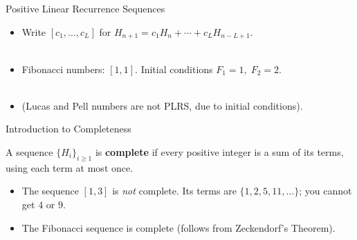 \documentclass[handout]{beamer}
\begin{document}
\begin{frame}{ 
    Positive Linear Recurrence Sequences}
    \begin{itemize}
        \item Write $[c_1, \ldots ,c_L]$ for $H_{n+1} = c_1 H_n + \cdots + c_L H_{n-L+1}$.\\ \
        \pause
        \item Fibonacci numbers: $[1,1]$. Initial conditions $F_1=1,\; F_2=2$.\\ \
        \pause
        \item (Lucas and Pell numbers are not PLRS, due to initial conditions).
    \end{itemize}
\end{frame}


\begin{frame} {
    Introduction to Completeness}
    \begin{definition}
        A sequence $\{H_i\}_{i \ge 1}$ is \textbf{complete} if every positive integer is a sum of its terms, using each term at most once.
    \end{definition}
    \medskip
    \begin{itemize}
    \pause
     \item The sequence $[1, 3]$ is \emph{not} complete. Its terms are $\{1,2,5,11,\dots\}$; you cannot get $4$ or $9$.\medskip
    \pause
    \item The Fibonacci sequence is complete (follows from Zeckendorf's Theorem).
    \end{itemize}
    
    
\end{frame}
\end{document}
